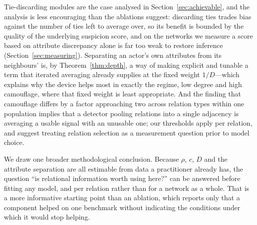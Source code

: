 \documentclass[../elsevier.tex]{subfiles}
\begin{document}
Tie-discarding modules are the case analysed in Section~\ref{sec:achievable}, and the
analysis is less encouraging than the ablations suggest: discarding ties trades bias
against the number of ties left to average over, so its benefit is bounded by the quality of the underlying suspicion score, and on the networks we measure a score
based on attribute discrepancy alone is far too weak to restore inference
(Section~\ref{sec:measuring}). Separating an actor's own attributes from its
neighbours' is, by Theorem~\ref{thm:depth}, a way of making explicit and tunable a
term that iterated averaging already supplies at the fixed weight $1/D$---which
explains why the device helps most in exactly the regime, low degree and high
camouflage, where that fixed weight is least appropriate. And the finding that
camouflage differs by a factor approaching two across relation types within one
population implies that a detector pooling relations into a single adjacency is
averaging a usable signal with an unusable one; our thresholds apply per relation, and
suggest treating relation selection as a measurement question prior to model choice.

We draw one broader methodological conclusion. Because $\rho$, $c$, $D$ and the
attribute separation are all estimable from data a practitioner already has, the
question ``is relational information worth using here?'' can be answered before
fitting any model, and per relation rather than for a network as a whole. That is a
more informative starting point than an ablation, which reports only that a component
helped on one benchmark without indicating the conditions under which it would stop
helping.
\end{document}
